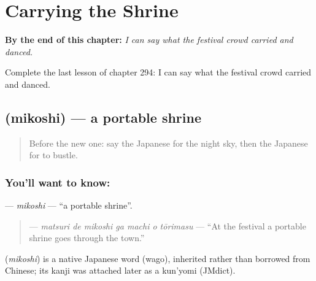 
\chapter{Carrying the Shrine}
\label{ch:ja-carrying-the-shrine}

\begin{chapteropening}
\textbf{By the end of this chapter:} \emph{I can say what the festival crowd carried and danced.}

Complete the last lesson of chapter 294: I can say what the festival crowd carried and danced.
\end{chapteropening}

\section[\texorpdfstring{\ja{みこし} (mikoshi)}{みこし (mikoshi)}]{ (mikoshi) — a portable shrine}

\label{lesson:JA-C294-mikoshi}



\begin{quote}
Before the new one: say the Japanese for the night sky, then the Japanese for to bustle.
\end{quote}

\subsection*{You'll want to know: }
\textbf{} — \emph{mikoshi} — \textquotedblleft{}a portable shrine\textquotedblright{}.

\begin{quote}
\textbf{   } — \emph{matsuri de mikoshi ga machi o tōrimasu} — \textquotedblleft{}At the festival a portable shrine goes through the town.\textquotedblright{}
\end{quote}

\begin{cousinweb}
\textbf{} (\emph{mikoshi}) is a native Japanese word (wago), inherited rather than borrowed from Chinese; its kanji was attached later as a kun'yomi (JMdict).
\end{cousinweb}

